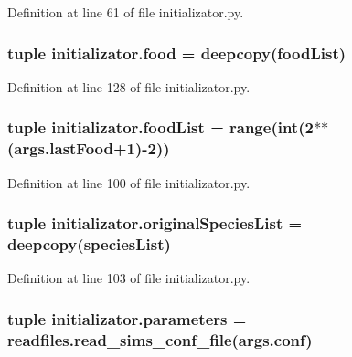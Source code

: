 Definition at line 61 of file initializator.\-py.

\hypertarget{a00135_a4fe31b6cfa3dcaa4141be9282566fa7a}{
\subsubsection[{food}]{\setlength{\rightskip}{0pt plus 5cm}tuple initializator.\-food = deepcopy({\bf food\-List})}}\label{a00135_a4fe31b6cfa3dcaa4141be9282566fa7a}


Definition at line 128 of file initializator.\-py.

\hypertarget{a00135_a402edf66e27aa29932e16311c9756b02}{
\subsubsection[{food\-List}]{\setlength{\rightskip}{0pt plus 5cm}tuple initializator.\-food\-List = range(int(2$\ast$$\ast$(args.\-last\-Food+1)-\/2))}}\label{a00135_a402edf66e27aa29932e16311c9756b02}


Definition at line 100 of file initializator.\-py.

\hypertarget{a00135_ab4024b0cf8a4136e81ae636c9cf6e0e4}{
\subsubsection[{original\-Species\-List}]{\setlength{\rightskip}{0pt plus 5cm}tuple initializator.\-original\-Species\-List = deepcopy({\bf species\-List})}}\label{a00135_ab4024b0cf8a4136e81ae636c9cf6e0e4}


Definition at line 103 of file initializator.\-py.

\hypertarget{a00135_a646de756d594b9a0eebf18c4eb9ee0d6}{
\subsubsection[{parameters}]{\setlength{\rightskip}{0pt plus 5cm}tuple initializator.\-parameters = readfiles.\-read\-\_\-sims\-\_\-conf\-\_\-file(args.\-conf)}}\label{a00135_a646de756d594b9a0eebf18c4eb9ee0d6}


